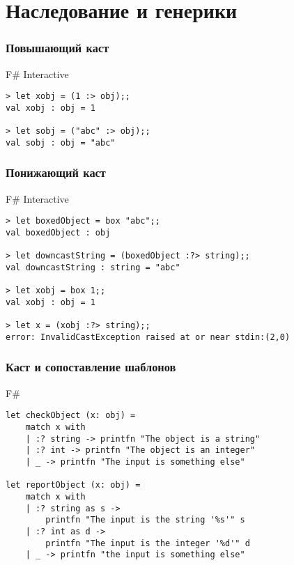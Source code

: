 \documentclass[xetex,mathserif,serif]{beamer}
\begin{document}
	\section{Наследование и генерики}
	
	\begin{frame}[fragile]
		\frametitle{Повышающий каст}
\begin{alertblock}{F\# Interactive}
\begin{lstlisting}[keywordstyle=\color{black}]
> let xobj = (1 :> obj);;
val xobj : obj = 1

> let sobj = ("abc" :> obj);;
val sobj : obj = "abc"
\end{lstlisting}
\end{alertblock}
\end{frame}

	\begin{frame}[fragile]
		\frametitle{Понижающий каст}
\begin{alertblock}{F\# Interactive}
\begin{lstlisting}[keywordstyle=\color{black}]
> let boxedObject = box "abc";;
val boxedObject : obj

> let downcastString = (boxedObject :?> string);;
val downcastString : string = "abc"

> let xobj = box 1;;
val xobj : obj = 1

> let x = (xobj :?> string);;
error: InvalidCastException raised at or near stdin:(2,0)
\end{lstlisting}
\end{alertblock}
\end{frame}

	\begin{frame}[fragile]
		\frametitle{Каст и сопоставление шаблонов}
		\begin{exampleblock}{F\#}
			\begin{lstlisting}
let checkObject (x: obj) =
    match x with
    | :? string -> printfn "The object is a string"
    | :? int -> printfn "The object is an integer"
    | _ -> printfn "The input is something else"

let reportObject (x: obj) =
    match x with
    | :? string as s -> 
        printfn "The input is the string '%s'" s
    | :? int as d -> 
        printfn "The input is the integer '%d'" d
    | _ -> printfn "the input is something else"
\end{lstlisting}
\end{exampleblock}
\end{frame}
\end{document}
